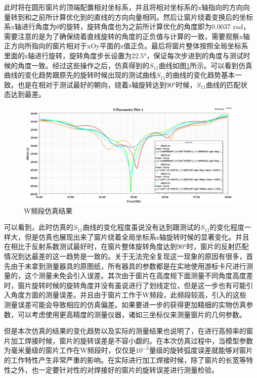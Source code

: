\documentclass[master]{thesis-uestc}
\begin{document}
此时将在圆形窗片的顶端配置相对坐标系，并且将相对坐标系的x轴指向的方向向量转到和之前所计算优化到的直线的方向向量相同。然后让窗片绕着变换后的坐标系x轴进行角度为\(\theta \)的旋转，旋转角度也为之前所计算优化的角度即为0.0037 rad，需要注意的是为了确保绕着直线旋转的角度的正负值与计算的一致，需要观察x轴正方向所指向的窗片相对于xOy平面的z值正负。最后将窗片整体按照全局坐标系里面的z轴进行旋转，旋转角度步长设置为22.5°，保证每次步进到的角度与测试时候的角度一致。经过这些操作之后，仿真得到的\(S_{11}\)曲线如图\ref{fig:W频段仿真结果}所示。可以看到仿真曲线的变化趋势跟原先的旋转时候出现的测试曲线\(S_{11}\)的曲线的变化趋势基本一致。也是在相对于测试最好的朝向，绕着z轴旋转达到90°时候，\(S_{11}\)曲线的匹配状态达到最差。
\begin{figure}[!htb]
    \centering
    \includegraphics[width=0.6\linewidth]{pic/chapter5/W频段仿真结果.png}
    \caption{W频段仿真结果}
    \label{fig:W频段仿真结果}
\end{figure}

可以看到，此时仿真的\(S_{11}\)曲线的变化程度虽说没有达到跟测试的\(S_{11}\)的变化程度一样大，但是仿真也展现出来了窗片绕着全局坐标系z轴旋转时候的显著变化。并且在相比于反射系数测试最好时，在窗片整体旋转角度达到90°时，窗片的反射匹配情况到达最差的这一趋势是一致的。关于无法完全复现这一现象的原因有很多，首先由于未拿到测量器具的原图纸，所有器具的参数都是在实地使用游标卡尺进行测量的，这个测量未免会引入误差。其次由于窗片在高度规下面测量不同角度高度差时，窗片旋转时候的旋转角度并没有虽说进行了划线定位，但是这一步也有可能引入角度方面的测量误差。并且由于窗片工作于W频段，此频段较高，引入的这些测量误差可能会导致相应的仿真偏差。如果要进一步的获得更加精细的实物仿真参数，可以考虑使用更高精度的测量仪器，诸如三坐标仪来测量窗片的几何参数。

但是本次仿真的结果的变化趋势以及实际的测量结果也说明了，在进行高频率的窗片加工焊接时候，窗片的旋转误差是不容小觑的。在本次仿真过程中，当模型参数为毫米量级的窗片工作在W频段时，仅仅是\(10^{-3}\)量级的旋转弧度误差就能够对窗片的工作特性产生非常严重的影响。在实际进行加工焊接时候，除了窗片的长宽等特性之外，也一定要针对性的对焊接好的窗片的旋转误差进行测量检验。
\end{document}
